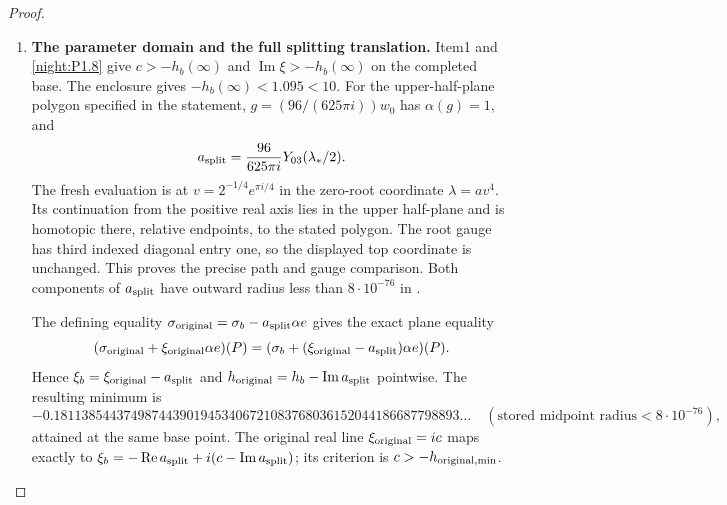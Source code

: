\begin{proof}
\begin{enumerate}[label=\arabic*.]
These maps also prove the cusp limit.  The lower block of $e_J$
is zero, so $L$ is independent of a real parameter $c$, and
$C_c$ is holomorphic at zero and affine in $c$.
For every fixed real $M$, it is uniformly bounded on a smaller
closed disc and the compact interval between $c_*$ and $-M$.
As $y\to\infty$, the Neumann inverse makes
$yI+\operatorname{Im}C_c$ invertible uniformly on that interval.
The real quantity $h_b+c$ cannot cross zero along it; its sign
at $c_*$ is positive, so $h_b-M>0$ at the other endpoint.
Thus $h_b\to+\infty$ at the cusp. The closed covers and the
central strict estimate prove the global minimum and uniqueness.

\item \textbf{The parameter domain and the full splitting translation.}
Item1 and \cref{night:P1.8} give
$c>-h_b(\infty)$ and $\operatorname{Im}\xi>-h_b(\infty)$
on the completed base. The enclosure gives
$-h_b(\infty)<1.095<10$.
For the upper-half-plane polygon specified in the statement,
$g=(96/(625\pi i))w_0$ has $\alpha(g)=1$, and
\[
 a_{\rm split}=\frac{96}{625\pi i}Y_{03}(\lambda_*/2).
\]
The fresh evaluation is at
$v=2^{-1/4}e^{\pi i/4}$ in the zero-root coordinate
$\lambda=av^4$.  Its continuation from the positive real axis
lies in the upper half-plane and is homotopic there, relative
endpoints, to the stated polygon. The root gauge has third
indexed diagonal entry one, so the displayed top coordinate is
unchanged. This proves the precise path and gauge comparison.
Both components of $a_{\rm split}$ have outward radius less than
$8\cdot10^{-76}$ in
.

The defining equality
$\sigma_{\rm original}=\sigma_b-a_{\rm split}\alpha e$
gives the exact plane equality
\[
 (\sigma_{\rm original}+\xi_{\rm original}\alpha e)(P)
 =(\sigma_b+(\xi_{\rm original}-a_{\rm split})\alpha e)(P).
\]
Hence $\xi_b=\xi_{\rm original}-a_{\rm split}$ and
$h_{\rm original}=h_b-\operatorname{Im}a_{\rm split}$ pointwise.
The resulting minimum is
\[
 -0.1811385443749874439019453406721083768036152044186687798893\ldots
 \quad(\text{stored midpoint radius}<8\cdot10^{-76}),
\]
attained at the same base point.
The original real line $\xi_{\rm original}=ic$ maps exactly to
$\xi_b=-\operatorname{Re}a_{\rm split}
       +i(c-\operatorname{Im}a_{\rm split})$;
its criterion is $c>-h_{{\rm original},\min}$.


\end{enumerate}
\end{proof}
